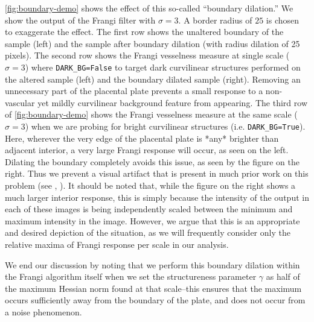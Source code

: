    \cref{fig:boundary-demo} shows the effect of this so-called ``boundary dilation.'' 
    We show the output of the Frangi filter with $\sigma=3$. A border radius of $25$ is chosen to exaggerate the effect.
    The first row shows the unaltered boundary of the sample (left) and
        the sample after boundary dilation (with radius dilation of 25 pixels).
    The second row shows the Frangi vesselness measure at single scale ($\sigma=3$) where \texttt{DARK\_BG=False} to target dark curvilinear structures performed on the altered sample (left) and the boundary dilated sample (right). Removing an unnecessary part of
    the placental plate prevents a small response to a non-vascular yet mildly curvilinear
    background feature from appearing.
    The third row of \cref{fig:boundary-demo} shows the Frangi vesselness measure at the same scale ($\sigma=3$) when we are probing for bright curvilinear structures (i.e.
    \texttt{DARK\_BG=True}). Here, wherever the very edge of the placental plate is *any* brighter than adjacent interior, a very large Frangi response will occur, as seen on the left. Dilating the boundary completely avoids this issue, as seen by the figure on the right. Thus we prevent a visual artifact that is present in much prior work on this problem (see \cite{huynh2013filter}, \cite{almoussa-ucla-reu}).
    It should be noted that, while the figure on the right shows a much larger interior response, this is simply because the intensity of the output in each of these
    images is being independently scaled between the minimum and maximum intensity in the image. However, we argue that this is an appropriate and desired depiction of the situation, as we will frequently consider only the relative maxima of Frangi response per scale in our analysis.
    
    We end our discussion by noting that we perform this boundary dilation within the
    Frangi algorithm itself when we set the structureness parameter $\gamma$ as half of the maximum Hessian norm found at that scale--this ensures that the maximum occurs sufficiently away from the boundary of the plate, and does not occur from a noise phenomenon.

    
    
